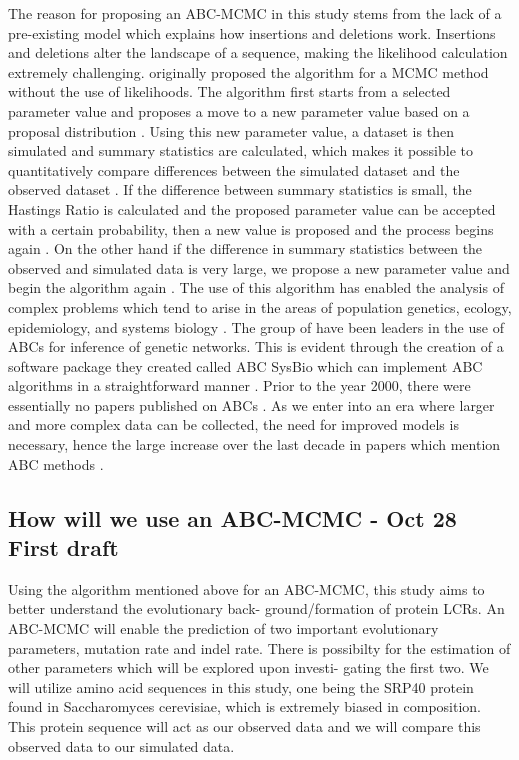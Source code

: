 \documentclass{article}
\begin{document}
The reason for proposing an ABC-MCMC in this study stems from the lack of a pre-existing model which explains how
insertions and deletions work. Insertions and deletions alter the landscape of a sequence, making the likelihood calculation
extremely challenging. \citet{marjoram2003markov} originally proposed the algorithm for a MCMC method without the use of
likelihoods. The algorithm first starts from a selected parameter value and proposes a move to a new parameter value based
on a proposal distribution \citep{marjoram2003markov}. Using this new parameter value, a dataset is then simulated and summary
statistics are calculated, which makes it possible to quantitatively compare differences between the simulated dataset and the
observed dataset \citep{marjoram2003markov}. If the difference between summary statistics is small, the Hastings Ratio is calculated
and the proposed parameter value can be accepted with a certain probability, then a new value is proposed and the process begins
again \citep{marjoram2003markov}. On the other hand if the difference in summary statistics between the observed and simulated
data is very large, we propose a new parameter value and begin the algorithm again \citep{marjoram2003markov, marjoram2013approximation}. The use of this algorithm has enabled the analysis of complex problems which tend to arise in the areas of population genetics, ecology, epidemiology, and systems biology \citep{sunnaaker2013approximate}. The group of \citet{liepe2010abc} have been leaders in the use of ABCs for inference of genetic networks. This is evident through the creation of a software package they created called ABC SysBio which can implement ABC algorithms in a straightforward manner \citep{marjoram2013approximation, liepe2010abc}. Prior to the year 2000, there were essentially no papers published on ABCs \citep{marjoram2013approximation}. As we enter into an era where larger and more complex data can be collected, the need for improved models is necessary, hence the large increase over the last decade in papers which mention ABC methods \citep{marjoram2013approximation}.

\subsection{How will we use an ABC-MCMC - Oct 28 First draft}
Using the algorithm mentioned above for an ABC-MCMC, this study aims to better understand the evolutionary back-
ground/formation of protein LCRs. An ABC-MCMC will enable the prediction of two important evolutionary parameters,
mutation rate and indel rate. There is possibilty for the estimation of other parameters which will be explored upon investi-
gating the first two. We will utilize amino acid sequences in this study, one being the SRP40 protein found in Saccharomyces
cerevisiae, which is extremely biased in composition. This protein sequence will act as our observed data and we will compare
this observed data to our simulated data.
\end{document}

